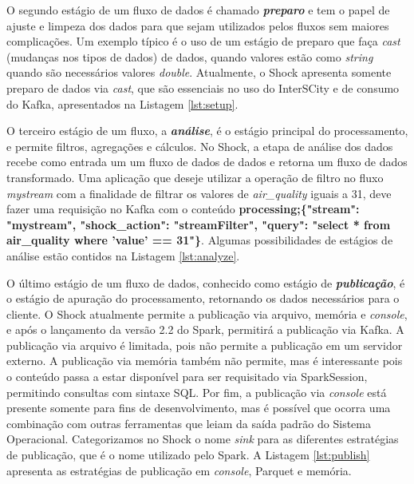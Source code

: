 

O segundo estágio de um fluxo de dados é chamado \textit{\textbf{preparo}} e tem o papel
de ajuste e limpeza dos dados para que sejam utilizados pelos fluxos
sem maiores complicações. Um exemplo típico é o uso de um estágio de preparo
que faça \textit{cast} (mudanças nos tipos de dados) de dados, quando valores estão como
\textit{string} quando são necessários valores \textit{double}. Atualmente,
o Shock apresenta somente preparo de dados via \textit{cast}, que são essenciais
no uso do InterSCity e de consumo do Kafka, apresentados na Listagem
\ref{lst:setup}.



O terceiro estágio de um fluxo, a \textit{\textbf{análise}}, é o
estágio principal do processamento, e permite filtros, agregações e cálculos.
No Shock, a etapa de análise dos dados recebe como entrada um um fluxo de dados
de dados e retorna um fluxo de dados transformado. Uma aplicação que deseje
utilizar a operação de filtro no fluxo \textit{mystream} com a finalidade
de filtrar os valores de \textit{air\_quality} iguais a 31, deve fazer uma
requisição no Kafka com o conteúdo \small{\textbf{processing;\{"stream": "mystream",
"shock\_action": "streamFilter", "query": "select * from air\_quality where
'value' == 31"\}}}. Algumas possibilidades de estágios de análise
estão contidos na Listagem \ref{lst:analyze}.



O último estágio de um fluxo de dados, conhecido como estágio de
\textit{\textbf{publicação}}, é o estágio
de apuração do processamento, retornando os dados necessários para o cliente.
O Shock atualmente permite a publicação via arquivo, memória e \textit{console}, e após o
lançamento da versão 2.2 do Spark, permitirá a publicação via Kafka. A
publicação via arquivo é limitada, pois não permite a publicação em um servidor
externo. A publicação via memória também não permite, mas é interessante pois
o conteúdo passa a estar disponível para ser requisitado via SparkSession,
permitindo consultas com sintaxe SQL. Por fim, a publicação via \textit{console} está
presente somente para fins de desenvolvimento, mas é possível que ocorra uma
combinação com outras ferramentas que leiam da saída padrão do Sistema Operacional.
Categorizamos no Shock o nome \textit{sink} para as diferentes estratégias de
publicação, que é o nome utilizado pelo Spark. A Listagem \ref{lst:publish}
apresenta as estratégias de publicação em \textit{console}, Parquet e memória.

